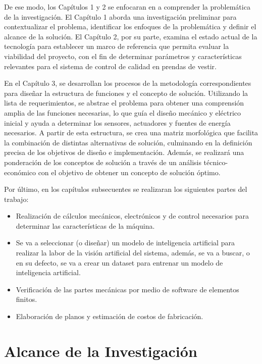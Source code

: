 De ese modo, los Capítulos 1 y 2 se enfocaran en a comprender la problemática de la investigación. El Capítulo 1 aborda una investigación preliminar para contextualizar el problema, identificar los enfoques de la problemática y definir el alcance de la solución. El Capítulo 2, por su parte, examina el estado actual de la tecnología para establecer un marco de referencia que permita evaluar la viabilidad del proyecto, con el fin de determinar parámetros y características relevantes para el sistema de control de calidad en prendas de vestir.

En el Capítulo 3, se desarrollan los procesos de la metodología correspondientes para diseñar la estructura de funciones y el concepto de solución. Utilizando la lista de requerimientos, se abstrae el problema para obtener una comprensión amplia de las funciones necesarias, lo que guía el diseño mecánico y eléctrico inicial y ayuda a determinar los sensores, actuadores y fuentes de energía necesarios. A partir de esta estructura, se crea una matriz morfológica que facilita la combinación de distintas alternativas de solución, culminando en la definición precisa de los objetivos de diseño e implementación. Además, se realizará una ponderación de los conceptos de solución a través de un análisis técnico-económico con el objetivo de obtener un concepto de solución óptimo.

Por último, en los capítulos subsecuentes se realizaran los siguientes partes del trabajo:

\begin{itemize}
	\setlength\itemsep{-0.5em}
	\item Realización de cálculos mecánicos, electrónicos y de control necesarios para determinar las características de la máquina.
	\item Se va a seleccionar (o diseñar) un modelo de inteligencia artificial para realizar la labor de la visión artificial del sistema, además, se va a buscar, o en su defecto, se va a crear un dataset para entrenar un modelo de inteligencia artificial.
	\item Verificación de las partes mecánicas por medio de software de elementos finitos.
	\item Elaboración de planos y estimación de costos de fabricación.
\end{itemize}

\section{Alcance de la Investigación}


